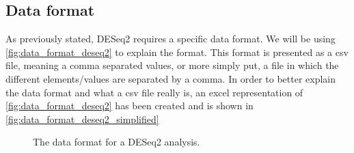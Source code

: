 \documentclass[11pt]{article}
\begin{document}
\subsection{Data format \label{deseq2 data_format}}
As previously stated, \acrshort{DESeq2} requires a specific data format. We will be using \autoref{fig:data_format_deseq2} to explain the format.
This format is presented as a \acrshort{csv} file, meaning a comma separated values, or more simply put, a file in which the different elements/values are separated by a comma.
In order to better explain the data format and what a \acrshort{csv} file really is, an excel representation of \autoref{fig:data_format_deseq2} has been created and is shown in \autoref{fig:data_format_deseq2_simplified}

\begin{figure}[h!]
\centering
{}
\caption{The data format for a \acrshort{DESeq2} analysis.}
\label{fig:data_format_deseq2}
\end{figure}
\end{document}
